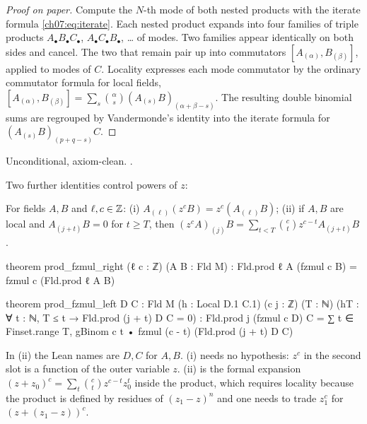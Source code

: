\begin{proof}[Proof on paper]
Compute the $N$-th mode of both nested products with the iterate formula
\eqref{ch07:eq:iterate}. Each nested product expands into four families of triple products
$A_\bullet B_\bullet C_\bullet$, $A_\bullet C_\bullet B_\bullet$, \dots{} of modes. Two families
appear identically on both sides and cancel. The two that remain pair up into commutators
$[A_{(\alpha)},B_{(\beta)}]$, applied to modes of $C$. Locality expresses each mode commutator by
the ordinary commutator formula for local fields,
$[A_{(\alpha)},B_{(\beta)}] = \sum_s\binom\alpha s(A_{(s)}B)_{(\alpha+\beta-s)}$. The resulting
double binomial sums are regrouped by Vandermonde's identity into the iterate formula for
$(A_{(s)}B)_{(p+q-s)}C$.
\end{proof}

\begin{status}
Unconditional, axiom-clean. .
\end{status}

Two further identities control powers of $z$:

\begin{proposition}\label{ch07:prop:zpow}
For fields $A,B$ and $\ell,c\in{\mathbb{Z}}$: (i) $A_{(\ell)}(z^cB) = z^c(A_{(\ell)}B)$; (ii) if $A,B$ are
local and $A_{(j+t)}B = 0$ for $t\ge T$, then $(z^cA)_{(j)}B = \sum_{t<T}\binom ct z^{c-t}
A_{(j+t)}B$.
\end{proposition}

\begin{leancode}
theorem prod_fzmul_right (ℓ c : ℤ) (A B : Fld M) :
    Fld.prod ℓ A (fzmul c B) = fzmul c (Fld.prod ℓ A B)

theorem prod_fzmul_left {D C : Fld M} (h : Local D.1 C.1) (c j : ℤ) (T : ℕ)
    (hT : ∀ t : ℕ, T ≤ t → Fld.prod (j + t) D C = 0) :
    Fld.prod j (fzmul c D) C
      = ∑ t ∈ Finset.range T, gBinom c t • fzmul (c - t) (Fld.prod (j + t) D C)
\end{leancode}

\begin{dictionary}
In (ii) the Lean names are $D,C$ for $A,B$. (i) needs no hypothesis: $z^c$ in the second slot
is a function of the outer variable $z$. (ii) is the formal expansion
$(z+z_0)^c = \sum_t\binom ct z^{c-t}z_0^t$ inside the product, which requires locality because
the product is defined by residues of $(z_1-z)^n$ and one needs to trade $z_1^c$ for
$(z+(z_1-z))^c$.
\end{dictionary}

